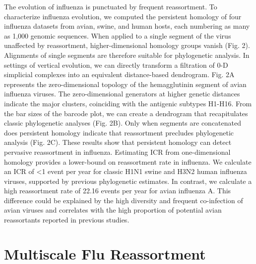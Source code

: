The evolution of influenza is punctuated by frequent reassortment.
To characterize influenza evolution, we computed the persistent homology of four influenza datasets from avian, swine, and human hosts, each numbering as many as 1,000 genomic sequences.
When applied to a single segment of the virus unaffected by reassortment, higher-dimensional homology groups vanish (Fig. 2).
Alignments of single segments are therefore suitable for phylogenetic analysis.
In settings of vertical evolution, we can directly transform a filtration of 0-D simplicial complexes into an equivalent distance-based dendrogram.
Fig. 2A represents the zero-dimensional topology of the hemagglutinin segment of avian influenza viruses. 
The zero-dimensional generators at higher genetic distances indicate the major clusters, coinciding with the antigenic subtypes H1-H16.
From the bar sizes of the barcode plot, we can create a dendrogram that recapitulates classic phylogenetic analyses (Fig. 2B).
Only when segments are concatenated does persistent homology indicate that reassortment precludes phylogenetic analysis (Fig. 2C).
These results show that persistent homology can detect pervasive reassortment in influenza.
Estimating ICR from one-dimensional homology provides a lower-bound on reassortment rate in influenza.
We calculate an ICR of <1 event per year for classic H1N1 swine and H3N2 human influenza viruses, supported by previous phylogenetic estimates.
In contrast, we calculate a high reassortment rate of 22.16 events per year for avian influenza A.
This difference could be explained by the high diversity and frequent co-infection of avian viruses and correlates with the high proportion of potential avian reassortants reported in previous studies.

\section{Multiscale Flu Reassortment}
\label{sec:flu_multiscale_reassortment}

